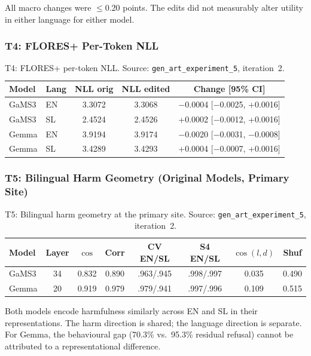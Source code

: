 \documentclass[11pt,letterpaper]{article}
\begin{document}
All macro changes were $\leq$0.20 points. The edits did not measurably alter utility in either language for either model.


\subsubsection{T4: FLORES+ Per-Token NLL}

\begin{table}[!htbp]
\centering
\caption{T4: FLORES+ per-token NLL. Source: \texttt{gen\_art\_experiment\_5}, iteration~2.}
\label{tab:t4_flores}
\small
\begin{tabular}{llccc}
\toprule
Model & Lang & NLL orig & NLL edited & Change [95\% CI] \\
\midrule
GaMS3 & EN & 3.3072 & 3.3068 & $-$0.0004 [$-$0.0025, +0.0016] \\
GaMS3 & SL & 2.4524 & 2.4526 & +0.0002 [$-$0.0012, +0.0016] \\
Gemma & EN & 3.9194 & 3.9174 & $-$0.0020 [$-$0.0031, $-$0.0008] \\
Gemma & SL & 3.4289 & 3.4293 & +0.0004 [$-$0.0007, +0.0016] \\
\bottomrule
\end{tabular}
\end{table}


\subsubsection{T5: Bilingual Harm Geometry (Original Models, Primary Site)}

\begin{table}[!htbp]
\centering
\caption{T5: Bilingual harm geometry at the primary site. Source: \texttt{gen\_art\_experiment\_5}, iteration~2.}
\label{tab:t5_geometry}
\small
\begin{tabular}{lccccccc}
\toprule
Model & Layer & $\cos$ & Corr & CV EN/SL & S4 EN/SL & $\cos(l, d)$ & Shuf \\
\midrule
GaMS3 & 34 & 0.832 & 0.890 & .963/.945 & .998/.997 & 0.035 & 0.490 \\
Gemma & 20 & 0.919 & 0.979 & .979/.941 & .997/.996 & 0.109 & 0.515 \\
\bottomrule
\end{tabular}
\end{table}

Both models encode harmfulness similarly across EN and SL in their representations. The harm direction is shared; the language direction is separate. For Gemma, the behavioural gap (70.3\% vs.\ 95.3\% residual refusal) cannot be attributed to a representational difference.
\end{document}
